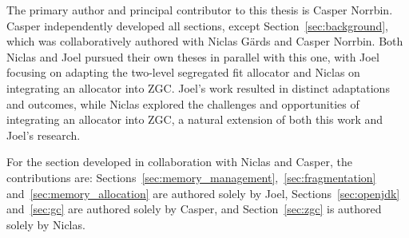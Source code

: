 The primary author and principal contributor to this thesis is Casper Norrbin. Casper independently developed all sections, except Section~\ref{sec:background}, which was collaboratively authored with Niclas Gärds and Casper Norrbin. Both Niclas and Joel pursued their own theses in parallel with this one, with Joel focusing on adapting the two-level segregated fit allocator and Niclas on integrating an allocator into ZGC. Joel's work resulted in distinct adaptations and outcomes, while Niclas explored the challenges and opportunities of integrating an allocator into ZGC, a natural extension of both this work and Joel's research.

For the section developed in collaboration with Niclas and Casper, the contributions are: Sections~\ref{sec:memory_management},~\ref{sec:fragmentation} and~\ref{sec:memory_allocation} are authored solely by Joel, Sections~\ref{sec:openjdk} and~\ref{sec:gc} are authored solely by Casper, and Section~\ref{sec:zgc} is authored solely by Niclas.

